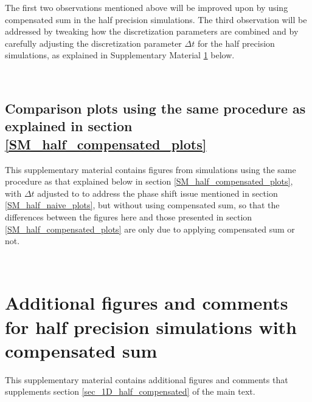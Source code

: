 The first two observations mentioned above will be improved upon by using compensated sum in the half precision simulations.
%
The third observation will be addressed by tweaking how the discretization parameters are combined and by carefully adjusting the discretization parameter $\Delta t$ for the half precision simulations, as explained in Supplementary Material \ref{SM_half_compensated} below.


\ \newline
\ \newline
\ \newline



\subsection{Comparison plots using the same procedure as explained in section \ref{SM_half_compensated_plots}}
\label{SM_half_naive_more_plots}
%
This supplementary material contains figures from simulations using the same procedure as that explained below in section \ref{SM_half_compensated_plots}, with $\Delta t$ adjusted to  to address the phase shift issue mentioned in section \ref{SM_half_naive_plots}, but without using compensated sum,
%
so that the differences between the figures here and those presented in section \ref{SM_half_compensated_plots} are only due to applying compensated sum or not.

\ \newline
\ \newline
\ \newline



\newpage
\section{Additional figures and comments for half precision simulations with compensated sum}\label{SM_half_compensated}


This supplementary material contains additional figures and comments that supplements section \ref{sec_1D_half_compensated} of the main text.


